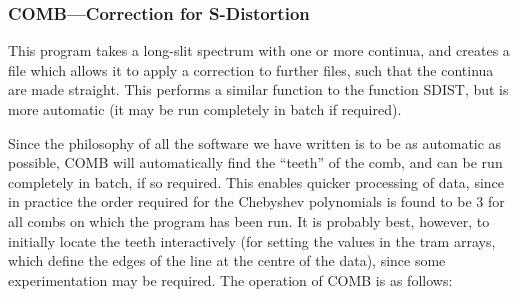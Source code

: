 \subsubsection{%
COMB---Correction for S-Distortion}

This program takes a long-slit spectrum with one or more continua, and
creates a file which allows it to apply a correction to further files,
such that the continua are made straight.  This performs a similar
function to the  function SDIST, but is more
automatic (it may be run completely in batch if required).

Since the philosophy of all the software we have written is to be as
automatic as possible, COMB will automatically find the ``teeth'' of
the comb, and can be run completely in batch, if so required. This
enables quicker processing of data, since in practice the order
required for the Chebyshev polynomials is
found to be 3 for all combs on which the program has been run. It is
probably best, however, to initially locate the teeth interactively
(for setting the values in the tram arrays, which define the edges of
the line at the centre of the data), since some experimentation may be
required. The operation of COMB is as follows:

